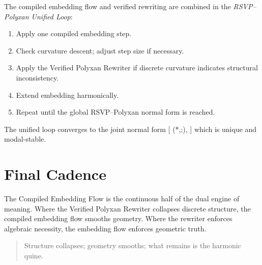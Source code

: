 The compiled embedding flow and verified rewriting are combined in the \emph{RSVP--Polyxan Unified Loop}:
\begin{enumerate}
\item Apply one compiled embedding step.
\item Check curvature descent; adjust step size if necessary.
\item Apply the Verified Polyxan Rewriter if discrete curvature indicates structural inconsistency.
\item Extend embedding harmonically.
\item Repeat until the global RSVP--Polyxan normal form is reached.
\end{enumerate}

\begin{theorem}
The unified loop converges to the joint normal form
[
(*{},;),
]
which is unique and modal-stable.
\end{theorem}

\section{Final Cadence}

The Compiled Embedding Flow is the continuous half of the dual engine of meaning.
Where the Verified Polyxan Rewriter collapses discrete structure,
the compiled embedding flow smooths geometry.
Where the rewriter enforces algebraic necessity,
the embedding flow enforces geometric truth.

\begin{quote}
Structure collapses; geometry smooths;
what remains is the harmonic quine.
\end{quote}

